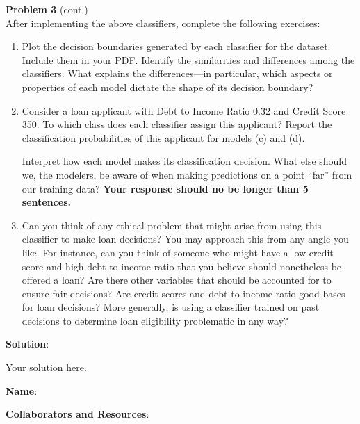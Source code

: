 \documentclass[submit]{../harvardml}
\newenvironment{solution}{
    \vspace{2mm}
    \color{blue}\noindent\textbf{Solution}:
}{}
\begin{document}
\begin{framed}
  \noindent\textbf{Problem 3} (cont.)\\

After implementing the above classifiers, complete the following exercises:
  \begin{enumerate}



      \item Plot the decision boundaries generated by each classifier for the dataset. Include them in your PDF.
            Identify the similarities and differences among the classifiers. What explains the differences---in particular, which aspects or properties of each model dictate the shape of its decision boundary?
    
      \item
    
            Consider a loan applicant with Debt to Income Ratio 0.32 and Credit Score 350. To which class does each classifier assign this applicant? Report the classification probabilities of this applicant for models (c) and (d).
            
            Interpret how each model makes its classification decision. What else should we, the modelers, be aware of when making predictions on a point “far” from our training data? \textbf{Your response should no be longer than 5 sentences.}

    \item
        Can you think of any ethical problem that might arise from using this classifier to make loan decisions? You may approach this from any angle you like. For instance, can you think of someone who might have a low credit score and high debt-to-income ratio that you believe should nonetheless be offered a loan? Are there other variables that should be accounted for to ensure fair decisions? Are credit scores and debt-to-income ratio good bases for loan decisions? More generally, is using a classifier trained on past decisions to determine loan eligibility problematic in any way?
    \end{enumerate}
\end{framed}

\newpage

\begin{solution}
	Your solution here.
\end{solution}

\newpage
\newpage

\textbf{Name}:

\textbf{Collaborators and Resources}: 
\end{document}
